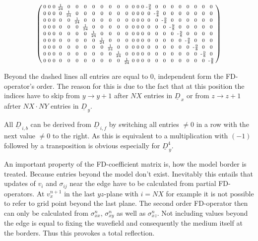 \documentclass[pdftex,a4paper,parskip,listof=totoc,bibliography=totoc,onehalfspacing,12pt]{scrreprt}
\begin{document}
\begin{align*}
\begin{psmallmatrix}
0 & 0 & 0 & \frac{1}{24} & 0 & 0 & 0 & 0 & 0 & 0 & 0 & 0 & 0 & 0 & 0 & \text{-}\frac{9}{8} & 0 & 0 & 0 & 0 & 0 & 0 & 0 & 0 \\
0 & 0 & 0 & 0 & \frac{1}{24} & 0 & 0 & 0 & 0 & 0 & 0 & 0 & 0 & 0 & 0 & 0 & \text{-}\frac{9}{8} & 0 & 0 & 0 & 0 & 0 & 0 & 0 \\
0 & 0 & 0 & 0 & 0 & \frac{1}{24} & 0 & 0 & 0 & 0 & 0 & 0 & 0 & 0 & 0 & 0 & 0 & \text{-}\frac{9}{8} & 0 & 0 & 0 & 0 & 0 & 0 \\
0 & 0 & 0 & 0 & 0 & 0 & \frac{1}{24} & 0 & 0 & 0 & 0 & 0 & 0 & 0 & 0 & 0 & 0 & 0 & \text{-}\frac{9}{8} & 0 & 0 & 0 & 0 & 0 \\
0 & 0 & 0 & 0 & 0 & 0 & 0 & \frac{1}{24} & 0 & 0 & 0 & 0 & 0 & 0 & 0 & 0 & 0 & 0 & 0 & \text{-}\frac{9}{8} & 0 & 0 & 0 & 0 \\
0 & 0 & 0 & 0 & 0 & 0 & 0 & 0 & \frac{1}{24} & 0 & 0 & 0 & 0 & 0 & 0 & 0 & 0 & 0 & 0 & 0 & \text{-}\frac{9}{8} & 0 & 0 & 0 \\
0 & 0 & 0 & 0 & 0 & 0 & 0 & 0 & 0 & \frac{1}{24} & 0 & 0 & 0 & 0 & 0 & 0 & 0 & 0 & 0 & 0 & 0 & \text{-}\frac{9}{8} & 0 & 0 \\
0 & 0 & 0 & 0 & 0 & 0 & 0 & 0 & 0 & 0 & \frac{1}{24} & 0 & 0 & 0 & 0 & 0 & 0 & 0 & 0 & 0 & 0 & 0 & \text{-}\frac{9}{8} & 0 \\
0 & 0 & 0 & 0 & 0 & 0 & 0 & 0 & 0 & 0 & 0 & \frac{1}{24} & 0 & 0 & 0 & 0 & 0 & 0 & 0 & 0 & 0 & 0 & 0 & \text{-}\frac{9}{8} \\
\end{psmallmatrix}
\end{align*}

Beyond the dashed lines all entries are equal to 0, independent form the FD-operator's order. The reason for this is due to the fact that at this position the indices have to skip from $y\rightarrow y+1$ after $NX$ entries in $\underline{D}_{\,x}$ or from $z\rightarrow z+1$ afrter $NX \cdot NY$ entries in $\underline{D}_{\,y}$.

All $\underline{D}_{\,i,b}$ can be derived from $\underline{D}_{\,i,f}$ by switching all entries $\neq 0$  in a row with the next value $\neq 0$ to the right. As this is equivalent to a multiplication with $(-1)$ followed by a transposition is obvious especially for $\underline{D}_{\,y}^4$.

An important property of the FD-coefficient matrix is, how the model border is treated. Because entries beyond the model don't exist. Inevitably this entails that updates of $v_i$ and $\sigma_{ij}$ near the edge have to be calculated from partial FD-operators. At $v_x^{n+1}$ in the last $yz$-plane with $i=NX$ for example it is not possible to refer to grid point beyond the last plane. The second order FD-operator then can only be calculated from $\sigma_{xx}^n$, $\sigma_{xy}^n$ as well as $\sigma_{xz}^n$. Not including values beyond the edge is equal to fixing the wavefield and consequently the medium itself at the borders. Thus this provokes a total reflection. 
\end{document}
